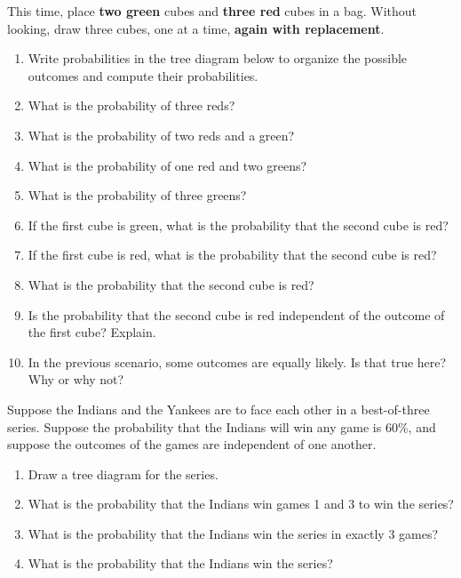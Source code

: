 \documentclass[nooutcomes]{ximera}
\begin{document}
\newpage
\begin{problem}
This time, place \textbf{two green} cubes and \textbf{three red} cubes in a bag.  Without looking, draw three cubes, one at a time, \textbf{again with replacement}.  
\begin{enumerate}
\item Write probabilities in the tree diagram below to organize the possible outcomes and compute their probabilities.  
\vspace{.15in}
\item What is the probability of three reds? 
\item What is the probability of two reds and a green? 
\item What is the probability of one red and two greens? 
\item What is the probability of three greens? 
\item If the first cube is green, what is the probability that the second cube is red? 
\item If the first cube is red, what is the probability that the second cube is red? 
\item What is the probability that the second cube is red?  
\item Is the probability that the second cube is red independent of the outcome of the first cube?  Explain. 
\item In the previous scenario, some outcomes are equally likely.  Is that true here?  Why or why not? 
\end{enumerate}
\end{problem}

\newpage

\begin{problem}
Suppose the Indians and the Yankees are to face each other in a best-of-three series.  Suppose the probability that the Indians will win any game is 60\%, and suppose the outcomes of the games are independent of one another.  
\begin{enumerate}
\item Draw a tree diagram for the series.  
\item What is the probability that the Indians win games 1 and 3 to win the series?
\item What is the probability that the Indians win the series in exactly 3 games?
\item What is the probability that the Indians win the series?
\end{enumerate}
\end{problem}
\end{document}
